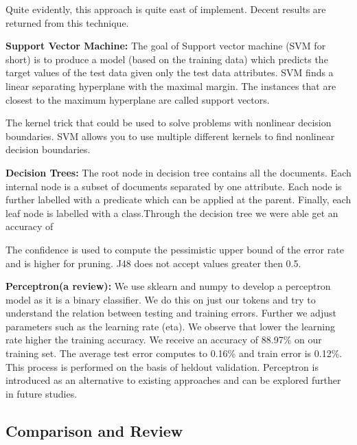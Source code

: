 Quite evidently, this approach is quite east of implement. Decent results are returned from this technique.

\textbf{Support Vector Machine:} The goal of Support vector machine (SVM for short) is to produce a model (based on the training data) which predicts the target values of the test data given only the test data attributes. SVM finds a linear separating hyperplane with the maximal margin. The instances that are closest to the maximum hyperplane are called support vectors. 

The kernel trick that could be used to solve problems with nonlinear decision boundaries. SVM allows you to use multiple different kernels to find nonlinear decision boundaries. 

\textbf{Decision Trees:} The root node in decision tree contains all the documents. Each internal node is a subset of documents separated by one attribute. Each node is further labelled with a predicate which can be applied at the parent. Finally, each leaf node is labelled with a class.Through the decision tree we were able get an accuracy of 

The confidence is used to compute the pessimistic upper bound of the error rate and is higher for pruning. J48 does not accept values greater then 0.5. 

\textbf{} 

\textbf{Perceptron(a review):} 
We use sklearn and numpy to develop a perceptron model as it is a binary classifier. We do this on just our tokens and try to understand the relation between testing and training errors. Further we adjust parameters such as the learning rate (eta). We observe that lower the learning rate higher the training accuracy. We receive an accuracy of 88.97\% on our training set. The average test error computes to 0.16\% and train error is 0.12\%. This process is performed on the basis of heldout validation. Perceptron is introduced as an alternative to existing approaches and can be explored further in future studies. 


   
\begin{table}[t]
\centering

\aftertabspace
\end{table}





\subsection{Comparison and Review}
\label{sec-somethingnew}

